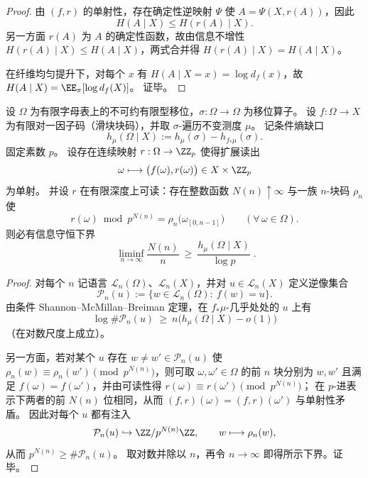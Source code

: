 \begin{proof}
由 \((f,r)\) 的单射性，存在确定性逆映射 \(\Psi\) 使 \(A=\Psi(X,r(A))\)，因此
\[
H(A\mid X)\le H(r(A)\mid X).
\]
另一方面 \(r(A)\) 为 \(A\) 的确定性函数，故由信息不增性 \(H(r(A)\mid X)\le H(A\mid X)\)，两式合并得 \(H(r(A)\mid X)=H(A\mid X)\)。
\par
在纤维均匀提升下，对每个 \(x\) 有 \(H(A\mid X=x)=\log d_f(x)\)，故
\(
H(A\mid X)=\EE_{\pi}[\log d_f(X)]
\)。
证毕。
\end{proof}

\begin{theorem}\label{thm:pom-prime-register-conditional-entropy-rate-lowerbound}
设 \(\Omega\) 为有限字母表上的不可约有限型移位，\(\sigma:\Omega\to\Omega\) 为移位算子。
设 \(f:\Omega\to X\) 为有限对一因子码（滑块块码），并取 \(\sigma\)-遍历不变测度 \(\mu\)。
记条件熵缺口
\[
h_\mu(\Omega\mid X):=h_\mu(\sigma)-h_{f_*\mu}(\sigma).
\]
固定素数 \(p\)。
设存在连续映射 \(r:\Omega\to\ZZ_p\) 使得扩展读出
\[
\omega\longmapsto\bigl(f(\omega),r(\omega)\bigr)\in X\times\ZZ_p
\]
为单射。
并设 \(r\) 在有限深度上可读：存在整数函数 \(N(n)\uparrow\infty\) 与一族 \(n\)-块码 \(\rho_n\) 使
\[
r(\omega)\bmod p^{N(n)}=\rho_n\!\bigl(\omega_{[0,n-1]}\bigr)\qquad(\forall\,\omega\in\Omega).
\]
则必有信息守恒下界
\[
\boxed{\;
\liminf_{n\to\infty}\frac{N(n)}{n}\ \ge\ \frac{h_\mu(\Omega\mid X)}{\log p}\; }.
\]
\end{theorem}
\begin{proof}
对每个 \(n\) 记语言 \(\mathcal L_n(\Omega)\)、\(\mathcal L_n(X)\)，并对 \(u\in\mathcal L_n(X)\) 定义逆像集合
\[
\mathcal P_n(u):=\{w\in\mathcal L_n(\Omega):\ f(w)=u\}.
\]
由条件 Shannon--McMillan--Breiman 定理，在 \(f_*\mu\)-几乎处处的 \(u\) 上有
\[
\log\#\mathcal P_n(u)\ \ge\ n\bigl(h_\mu(\Omega\mid X)-o(1)\bigr)
\]
（在对数尺度上成立）。
\par
另一方面，若对某个 \(u\) 存在 \(w\neq w'\in\mathcal P_n(u)\) 使 \(\rho_n(w)\equiv\rho_n(w')\pmod{p^{N(n)}}\)，则可取 \(\omega,\omega'\in\Omega\) 的前 \(n\) 块分别为 \(w,w'\) 且满足 \(f(\omega)=f(\omega')\)，并由可读性得 \(r(\omega)\equiv r(\omega')\pmod{p^{N(n)}}\)；
在 \(p\)-进表示下两者的前 \(N(n)\) 位相同，从而 \((f,r)(\omega)=(f,r)(\omega')\) 与单射性矛盾。
因此对每个 \(u\) 都有注入
\[
\mathcal P_n(u)\hookrightarrow \ZZ/p^{N(n)}\ZZ,
\qquad
w\longmapsto \rho_n(w),
\]
从而 \(p^{N(n)}\ge \#\mathcal P_n(u)\)。
取对数并除以 \(n\)，再令 \(n\to\infty\) 即得所示下界。证毕。
\end{proof}

